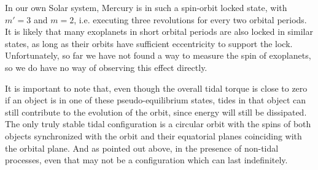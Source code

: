 In our own Solar system, Mercury is in such a spin-orbit locked state, with
$m'=3$ and $m=2$, i.e. executing three revolutions for every two orbital
periods. It is likely that many exoplanets in short orbital periods are also
locked in similar states, as long as their orbits have sufficient eccentricity
to support the lock. Unfortunately, so far we have not found a way to measure
the spin of exoplanets, so we do have no way of observing this effect directly.

It is important to note that, even though the overall tidal torque is close to
zero if an object is in one of these pseudo-equilibrium states, tides in that
object can still contribute to the evolution of the orbit, since energy will
still be dissipated. The only truly stable tidal configuration is a circular
orbit with the spins of both objects synchronized with the orbit and their
equatorial planes coinciding with the orbital plane. And as pointed out above,
in the presence of non-tidal processes, even that may not be a configuration
which can last indefinitely.
